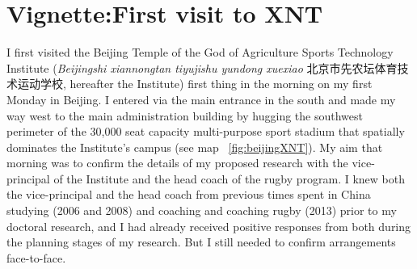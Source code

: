 
\section{Vignette:First visit to XNT}
I first visited the Beijing Temple of the God of Agriculture Sports Technology Institute (\textit{Beijingshi xiannongtan tiyujishu yundong xuexiao} 北京市先农坛体育技术运动学校,
hereafter the Institute) first thing in the morning on my first Monday in Beijing.  I entered via the main entrance in the south and made my way west to the main administration building by hugging the southwest perimeter of the 30,000 seat capacity multi-purpose sport stadium that spatially dominates the Institute's campus (see map ~\ref{fig:beijingXNT}). My aim that morning was to confirm the details of my proposed research with the vice-principal of the Institute and the head coach of the rugby program. I knew both the vice-principal and the head coach from previous times spent in China studying (2006 and 2008) and coaching and coaching rugby (2013) prior to my doctoral research, and I had already received positive responses from both during the planning stages of my research.  But I still needed to confirm arrangements face-to-face.

